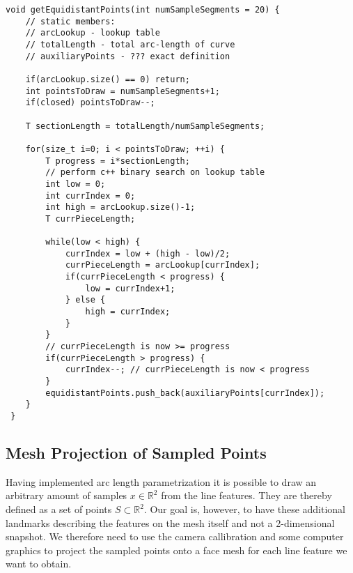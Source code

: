 \begin{lstlisting}[label=some-code, caption=Equidistant Sampling]
void getEquidistantPoints(int numSampleSegments = 20) {
    // static members: 
    // arcLookup - lookup table
    // totalLength - total arc-length of curve
    // auxiliaryPoints - ??? exact definition 

    if(arcLookup.size() == 0) return;
    int pointsToDraw = numSampleSegments+1; 
    if(closed) pointsToDraw--;

    T sectionLength = totalLength/numSampleSegments;

    for(size_t i=0; i < pointsToDraw; ++i) {
        T progress = i*sectionLength;
        // perform c++ binary search on lookup table
        int low = 0;
        int currIndex = 0;
        int high = arcLookup.size()-1;
        T currPieceLength; 

        while(low < high) {
            currIndex = low + (high - low)/2; 
            currPieceLength = arcLookup[currIndex];
            if(currPieceLength < progress) {
                low = currIndex+1;
            } else {
                high = currIndex;
            }
        }
        // currPieceLength is now >= progress
        if(currPieceLength > progress) {
            currIndex--; // currPieceLength is now < progress
        }
        equidistantPoints.push_back(auxiliaryPoints[currIndex]);   
    }
 }
\end{lstlisting}

\subsection{Mesh Projection of Sampled Points}
Having implemented arc length parametrization it is possible to draw an arbitrary amount of samples $x \in \mathbb{R}^2$ from the line features. They are thereby defined as a set of points $S \subset \mathbb{R}^2$. Our goal is, however, to have these additional landmarks describing the features on the mesh itself and not a 2-dimensional snapshot.
We therefore need to use the camera callibration and some computer graphics to project the sampled points onto a face mesh for each line feature we want to obtain.

